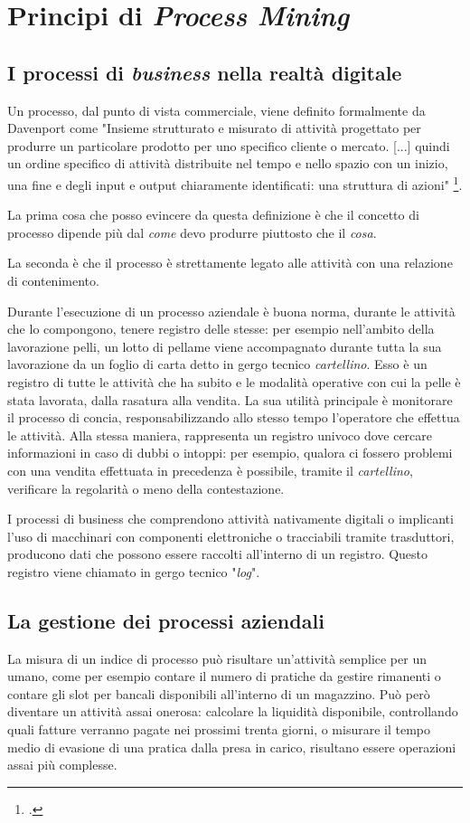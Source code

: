 \section{Principi di \textit{Process Mining}}
\subsection{I processi di \textit{business} nella realtà digitale}
Un processo, dal punto di vista commerciale, viene definito formalmente da Davenport come "Insieme strutturato e misurato di attività progettato per produrre un particolare prodotto per uno specifico cliente o mercato. [...] quindi un ordine specifico di attività distribuite nel tempo e nello spazio con un inizio, una fine e degli input e output chiaramente identificati: una struttura di azioni" \footcite{davenport:ProcessInnovation}.

La prima cosa che posso evincere da questa definizione è che il concetto di processo dipende più dal \emph{come} devo produrre piuttosto che il \emph{cosa}.

La seconda è che il processo è strettamente legato alle attività con una relazione di contenimento.

Durante l'esecuzione di un processo aziendale è buona norma, durante le attività che lo compongono, tenere registro delle stesse: per esempio nell'ambito della lavorazione pelli, un lotto di pellame viene accompagnato durante tutta la sua lavorazione da un foglio di carta detto in gergo tecnico \emph{cartellino}. Esso è un registro di tutte le attività che ha subito e le modalità operative con cui la pelle è stata lavorata, dalla rasatura alla vendita. La sua utilità principale è monitorare il processo di concia, responsabilizzando allo stesso tempo l'operatore che effettua le attività. Alla stessa maniera, rappresenta un registro univoco dove cercare informazioni in caso di dubbi o intoppi: per esempio, qualora ci fossero problemi con una vendita effettuata in precedenza è possibile, tramite il \emph{cartellino}, verificare la regolarità o meno della contestazione.

I processi di business che comprendono attività nativamente digitali o implicanti l'uso di macchinari con componenti elettroniche o tracciabili tramite trasduttori, producono dati che possono essere raccolti all'interno di un registro. Questo registro viene chiamato in gergo tecnico "\textit{log}".


\subsection{La gestione dei processi aziendali}
La misura di un indice di processo può risultare un'attività semplice per un umano, come per esempio contare il numero di pratiche da gestire rimanenti o contare gli slot per bancali disponibili all'interno di un magazzino. Può però diventare un attività assai onerosa: calcolare la liquidità disponibile, controllando quali fatture verranno pagate nei prossimi trenta giorni, o misurare il tempo medio di evasione di una pratica dalla presa in carico, risultano essere operazioni assai più complesse.

